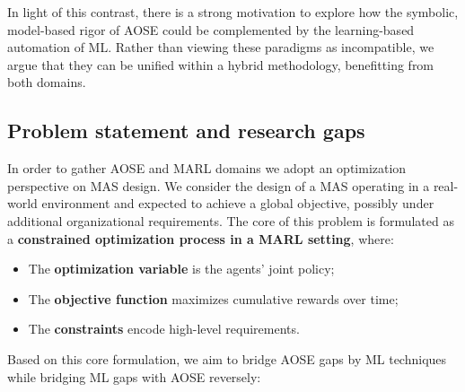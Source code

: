 \documentclass[pdflatex,sn-mathphys-num]{sn-jnl}%
\theoremstyle{thmstyleone}%
\theoremstyle{thmstyletwo}%
\theoremstyle{thmstylethree}%
\begin{document}
In light of this contrast, there is a strong motivation to explore how the symbolic, model-based rigor of AOSE could be complemented by the learning-based automation of ML. Rather than viewing these paradigms as incompatible, we argue that they can be unified within a hybrid methodology, benefitting from both domains.


\subsection{Problem statement and research gaps}

In order to gather AOSE and MARL domains we adopt an optimization perspective on MAS design.
We consider the design of a MAS operating in a real-world environment and expected to achieve a global objective, possibly under additional organizational requirements. The core of this problem is formulated as a \textbf{constrained optimization process in a MARL setting}, where:
\begin{itemize}
    \item The \textbf{optimization variable} is the agents' joint policy;
    \item The \textbf{objective function} maximizes cumulative rewards over time;
    \item The \textbf{constraints} encode high-level requirements.
\end{itemize}

Based on this core formulation, we aim to bridge AOSE gaps by ML techniques while bridging ML gaps with AOSE reversely:
\end{document}
